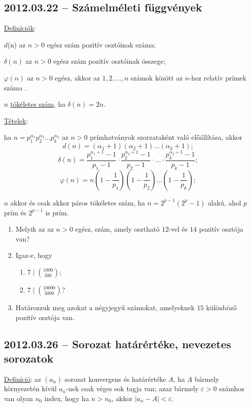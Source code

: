 \documentclass{article}
\newenvironment{abc}{\begin{enumerate}[label=\textit{\alph*})]}{\end{enumerate}}
\begin{document}
\subsection*{2012.03.22 -- Számelméleti függvények}

\underline{Definíciók}:

$d$(n) az $n>0$ egész szám pozitív osztóinak száma;

$\delta (n)$ az $n>0$ egész szám pozitív osztóinak összege;

$\varphi(n)$ az $n>0$ egész, akkor az $1,2,...,n$ számok között az $n$-hez relatív prímek száma .

$n$ \underline{tökéletes szám}, ha $\delta (n)=2n$.

\noindent\underline{Tételek}:

ha $n=p_1^{\alpha_1}p_2^{\alpha_2}\ldots p_k^{\alpha_k}$ az $n>0$ prímhatványok szorzataként való előállítása, akkor
$$d(n)=(\alpha_1 +1)(\alpha_2 +1)\ldots(\alpha_k +1);$$
$$\delta(n)=\frac{p_1^{\alpha_1 +1}-1}{p_1 -1}\cdot\frac{p_2^{\alpha_2 +1}-1}{p_2 -1}\cdot\ldots\cdot\frac{p_k^
{\alpha_2 +1}-1}{p_k -1};$$
$$\varphi(n)=n\left(1-\frac{1}{p_1}\right)\left(1-\frac{1}{p_2}\right)\ldots\left(1-\frac{1}{p_k}\right);$$

$n$ akkor és csak akkor páros tökéletes szám, ha $n=2^{p-1}(2^p-1)$ alakú, ahol $p$ prím és $2^{p-1}$ is prím.

\begin{enumerate}
\item Melyik az az $n>0$ egész, szám, amely osztható $12$-vel és $14$ pozitív osztója van?
\item Igaz-e, hogy 
\begin{abc}
\item $7\mid \binom{1000}{500}$;
\item $7\mid \binom{10000}{5000}$?
\end{abc}
\item Határozzuk meg azokat a négyjegyű számokat, amelyeknek $15$ különböző pozitív osztója van. 
\end{enumerate}

\subsection*{2012.03.26 -- Sorozat határértéke, nevezetes sorozatok }
\underline{Definíció}: az $(a_n)$ sorozat konvergens és határértéke $A$, ha $A$ bármely környezetén kívül $a_n$-nek csak véges sok tagja van; azaz bármely $\varepsilon>0$ számhoz van olyan $n_0$ index, hogy ha $n>n_0$, akkor $|a_n-A|<\varepsilon$.
\end{document}
